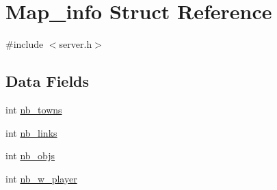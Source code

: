 \hypertarget{structMap__info}{\section{Map\-\_\-info Struct Reference}
\label{structMap__info}
}


{\ttfamily \#include $<$server.\-h$>$}

\subsection*{Data Fields}
\begin{DoxyCompactItemize}
\item 
int \hyperlink{structMap__info_ae5e7951963b1f7f7c7b80f42c7a6b04c}{nb\-\_\-towns}
\item 
int \hyperlink{structMap__info_a7c2cf198292c68f636c7c9be53dfbe82}{nb\-\_\-links}
\item 
int \hyperlink{structMap__info_af5511048dfe5f40291ef406c0c00bb1f}{nb\-\_\-objs}
\item 
int \hyperlink{structMap__info_a5fb8f492f437e97001f4f86eb758998b}{nb\-\_\-w\-\_\-player}
\end{DoxyCompactItemize}


